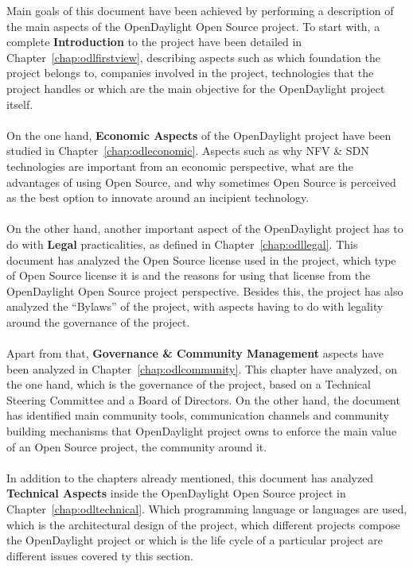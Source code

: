 \documentclass[a4paper, 12pt]{book}
\begin{document}
Main goals of this document have been achieved by performing a description of the main aspects of the OpenDaylight Open Source project. To start with, a complete \textbf{Introduction} to the project have been detailed in Chapter~\ref{chap:odlfirstview}, describing aspects such as which foundation the project belongs to, companies involved in the project, technologies that the project handles or which are the main objective for the OpenDaylight project itself.\\
\\
On the one hand, \textbf{Economic Aspects} of the OpenDaylight project have been studied in Chapter~\ref{chap:odleconomic}. Aspects such as why NFV \& SDN technologies are important from an economic perspective, what are the advantages of using Open Source, and why sometimes Open Source is perceived as the best option to innovate around an incipient technology.\\
\\
On the other hand, another important aspect of the OpenDaylight project has to do with \textbf{Legal} practicalities, as defined in Chapter~\ref{chap:odllegal}. This document has analyzed the Open Source license used in the project, which type of Open Source license it is and the reasons for using that license from the OpenDaylight Open Source project perspective. Besides this, the project has also analyzed the ``Bylaws'' of the project, with aspects having to do with legality around the governance of the project.\\
\\
Apart from that, \textbf{Governance \& Community Management} aspects have been analyzed in Chapter~\ref{chap:odlcommunity}. This chapter have analyzed, on the one hand, which is the governance of the project, based on a Technical Steering Committee and a Board of Directors. On the other hand, the document has identified main community tools, communication channels and community building mechanisms that OpenDaylight project owns to enforce the main value of an Open Source project, the community around it.\\
\\
In addition to the chapters already mentioned, this document has analyzed \textbf{Technical Aspects} inside the OpenDaylight Open Source project in Chapter~\ref{chap:odltechnical}. Which programming language or languages are used, which is the architectural design of the project, which different projects compose the OpenDaylight project or which is the life cycle of a particular project are different issues covered ty this section.\\
\end{document}
